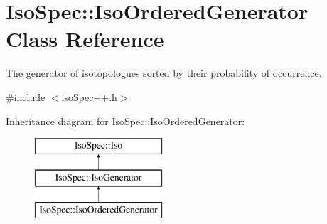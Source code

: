 \hypertarget{class_iso_spec_1_1_iso_ordered_generator}{}\section{Iso\+Spec\+:\+:Iso\+Ordered\+Generator Class Reference}
\label{class_iso_spec_1_1_iso_ordered_generator}


The generator of isotopologues sorted by their probability of occurrence.  




{\ttfamily \#include $<$iso\+Spec++.\+h$>$}

Inheritance diagram for Iso\+Spec\+:\+:Iso\+Ordered\+Generator\+:\begin{figure}[H]
\begin{center}
\leavevmode
\includegraphics[height=3.000000cm]{class_iso_spec_1_1_iso_ordered_generator}
\end{center}
\end{figure}
